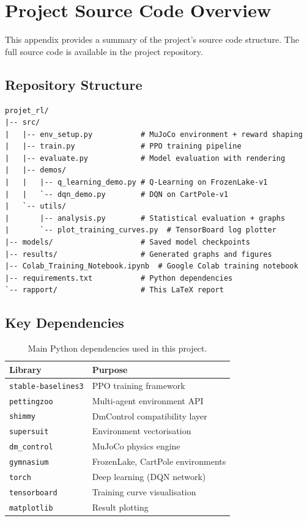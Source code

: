 \chapter{Project Source Code Overview}
\label{appn:A}

This appendix provides a summary of the project's source code structure. 
The full source code is available in the project repository.

\section*{Repository Structure}

\begin{verbatim}
projet_rl/
|-- src/
|   |-- env_setup.py           # MuJoCo environment + reward shaping
|   |-- train.py               # PPO training pipeline
|   |-- evaluate.py            # Model evaluation with rendering
|   |-- demos/
|   |   |-- q_learning_demo.py # Q-Learning on FrozenLake-v1
|   |   `-- dqn_demo.py        # DQN on CartPole-v1
|   `-- utils/
|       |-- analysis.py        # Statistical evaluation + graphs
|       `-- plot_training_curves.py  # TensorBoard log plotter
|-- models/                    # Saved model checkpoints
|-- results/                   # Generated graphs and figures
|-- Colab_Training_Notebook.ipynb  # Google Colab training notebook
|-- requirements.txt           # Python dependencies
`-- rapport/                   # This LaTeX report
\end{verbatim}

\section*{Key Dependencies}

\begin{table}[h!]
    \centering
    \caption{Main Python dependencies used in this project.}
    \begin{tabular}{ll}
        \toprule
        \textbf{Library} & \textbf{Purpose} \\
        \midrule
        \texttt{stable-baselines3} & PPO training framework \\
        \texttt{pettingzoo}        & Multi-agent environment API \\
        \texttt{shimmy}            & DmControl compatibility layer \\
        \texttt{supersuit}         & Environment vectorisation \\
        \texttt{dm\_control}       & MuJoCo physics engine \\
        \texttt{gymnasium}         & FrozenLake, CartPole environments \\
        \texttt{torch}             & Deep learning (DQN network) \\
        \texttt{tensorboard}       & Training curve visualisation \\
        \texttt{matplotlib}        & Result plotting \\
        \bottomrule
    \end{tabular}
\end{table}
